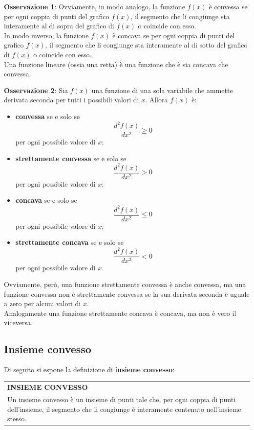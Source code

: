 \documentclass[a4paper]{extarticle}
\renewcommand\arraystretch{}
\begin{document}
\vspace{2em}
\noindent
\textbf{Osservazione 1}: Ovviamente, in modo analogo, la funzione $f(x)$ è convessa se per ogni coppia di punti del grafico $f(x)$, il segmento che li congiunge sta interamente al di sopra del grafico di $f(x)$ o coincide con esso.\\
In modo inverso, la funzione $f(x)$ è concava se per ogni coppia di punti del grafico $f(x)$, il segmento che li congiunge sta interamente al di sotto del grafico di $f(x)$ o coincide con esso.\\
Una funzione lineare (ossia una retta) è una funzione che è sia concava che convessa.

\vspace{1em}
\noindent
\textbf{Osservazione 2}: Sia $f(x)$ una funzione di una sola variabile che ammette derivata seconda per tutti i possibili valori di $x$. Allora $f(x)$ è:
\begin{itemize}
    \item \textbf{convessa} se e solo se 
    \[\frac{d^2 f(x)}{dx^2} \geq 0\]
    per ogni possibile valore di $x$;
    \item \textbf{strettamente convessa} se e solo se 
    \[\frac{d^2 f(x)}{dx^2} > 0\]
    per ogni possibile valore di $x$;
    \item \textbf{concava} se e solo se 
    \[\frac{d^2 f(x)}{dx^2} \leq 0\]
    per ogni possibile valore di $x$;
    \item \textbf{strettamente concava} se e solo se 
    \[\frac{d^2 f(x)}{dx^2} < 0\]
    per ogni possibile valore di $x$.
\end{itemize}
Ovviamente, però, una funzione strettamente convessa è anche convessa, ma una funzione convessa non è strettamente convessa se la sua derivata seconda è uguale a zero per alcuni valori di $x$.\\
Analogamente una funzione strettamente concava è concava, ma non è vero il viceversa.

\vspace{1em}
\noindent
\subsection{Insieme convesso}
Di seguito si espone la definizione di \textbf{insieme convesso}:

\vspace{1em}
\setlength{\tabcolsep}{14pt}
\renewcommand{\arraystretch}{2}
\noindent
\begin{tabularx}{\textwidth}{@{}|P|@{}}
    \hline
    {\textbf{INSIEME CONVESSO}}\\
    \parbox{\linewidth}{Un insieme convesso è un insieme di punti tale che, per ogni coppia di punti dell'insieme, il segmento che li congiunge è interamente contenuto nell'insieme stesso.\vspace{3mm}}\\
    \hline
\end{tabularx}
\end{document}

